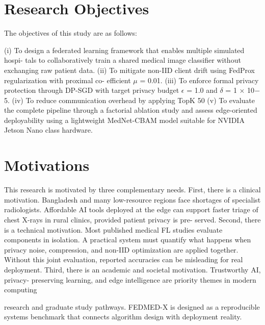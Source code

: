 \documentclass[12pt,a4paper]{report}
\begin{document}
\section{Research Objectives}
The objectives of this study are as follows:

(i) To design a federated learning framework that enables multiple simulated hospi- tals to collaboratively train a shared medical image classifier without exchanging raw patient data.
(ii) To mitigate non-IID client drift using FedProx regularization with proximal co- efficient $\mu$ = 0.01.
(iii) To enforce formal privacy protection through DP-SGD with target privacy budget $\epsilon$ = 1.0 and $\delta$ = 1 × 10$-$5.
(iv) To reduce communication overhead by applying TopK 50%
(v) To evaluate the complete pipeline through a factorial ablation study and assess edge-oriented deployability using a lightweight MedNet-CBAM model suitable for
NVIDIA Jetson Nano class hardware.
\section{Motivations}
This research is motivated by three complementary needs.
First, there is a clinical motivation. Bangladesh and many low-resource regions face shortages of specialist radiologists. Affordable AI tools deployed at the edge can support faster triage of chest X-rays in rural clinics, provided patient privacy is pre- served.
Second, there is a technical motivation.
Most published medical FL studies evaluate components in isolation. A practical system must quantify what happens when privacy noise, compression, and non-IID optimization are applied together. Without this joint evaluation, reported accuracies can be misleading for real deployment.
Third, there is an academic and societal motivation. Trustworthy AI, privacy- preserving learning, and edge intelligence are priority themes in modern computing

research and graduate study pathways.
FEDMED-X is designed as a reproducible systems benchmark that connects algorithm design with deployment reality.
\end{document}
